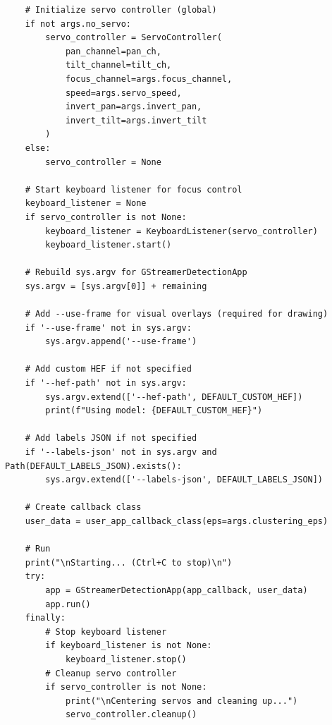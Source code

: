 \documentclass[11pt,a4paper]{article}
\begin{document}
\begin{lstlisting}
    # Initialize servo controller (global)
    if not args.no_servo:
        servo_controller = ServoController(
            pan_channel=pan_ch,
            tilt_channel=tilt_ch,
            focus_channel=args.focus_channel,
            speed=args.servo_speed,
            invert_pan=args.invert_pan,
            invert_tilt=args.invert_tilt
        )
    else:
        servo_controller = None
    
    # Start keyboard listener for focus control
    keyboard_listener = None
    if servo_controller is not None:
        keyboard_listener = KeyboardListener(servo_controller)
        keyboard_listener.start()
    
    # Rebuild sys.argv for GStreamerDetectionApp
    sys.argv = [sys.argv[0]] + remaining
    
    # Add --use-frame for visual overlays (required for drawing)
    if '--use-frame' not in sys.argv:
        sys.argv.append('--use-frame')
    
    # Add custom HEF if not specified
    if '--hef-path' not in sys.argv:
        sys.argv.extend(['--hef-path', DEFAULT_CUSTOM_HEF])
        print(f"Using model: {DEFAULT_CUSTOM_HEF}")
    
    # Add labels JSON if not specified
    if '--labels-json' not in sys.argv and Path(DEFAULT_LABELS_JSON).exists():
        sys.argv.extend(['--labels-json', DEFAULT_LABELS_JSON])
    
    # Create callback class
    user_data = user_app_callback_class(eps=args.clustering_eps)
    
    # Run
    print("\nStarting... (Ctrl+C to stop)\n")
    try:
        app = GStreamerDetectionApp(app_callback, user_data)
        app.run()
    finally:
        # Stop keyboard listener
        if keyboard_listener is not None:
            keyboard_listener.stop()
        # Cleanup servo controller
        if servo_controller is not None:
            print("\nCentering servos and cleaning up...")
            servo_controller.cleanup()

\end{lstlisting}
\end{document}
